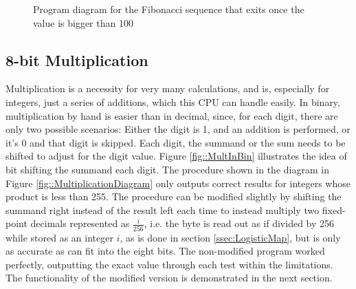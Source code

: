\begin{figure}[h!]
    \begin{center}
        {\small {}}
    \end{center}
    \caption[Fibonacci program diagram]{Program diagram for the Fibonacci sequence that exits once the value is bigger than 100}
    \label{fig::FibonacciDiagram}
\end{figure}

\subsection{8-bit Multiplication} \label{ssec::Multiplication}
Multiplication is a necessity for very many calculations, and is, especially for integers, just a series of additions, which this CPU can handle easily. In binary, multiplication by hand is easier than in decimal, since, for each digit, there are only two possible scenarios: Either the digit is 1, and an addition is performed, or it's 0 and that digit is skipped. Each digit, the summand or the sum needs to be shifted to adjust for the digit value. Figure \ref{fig::MultInBin} illustrates the idea of bit shifting the summand each digit. The procedure shown in the diagram in Figure \ref{fig::MultiplicationDiagram} only outputs correct results for integers whose product is less than 255. The procedure can be modified slightly by shifting the summand right instead of the result left each time to instead multiply two fixed-point decimals represented as $\frac{i}{256}$, i.e. the byte is read out as if divided by 256 while stored as an integer $i$, as is done in section \ref{ssec:LogisticMap}, but is only as accurate as can fit into the eight bits. The non-modified program worked perfectly, outputting the exact value through each test within the limitations. The functionality of the modified version is demonstrated in the next section.

